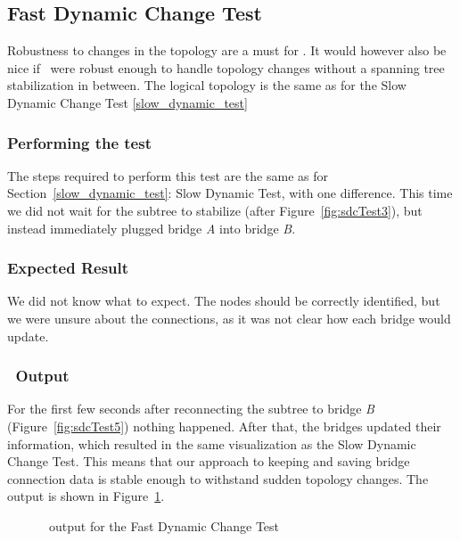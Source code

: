 \subsection*{Fast Dynamic Change Test}
\label{fast_dynamic_test}
Robustness to changes in the topology are a must for \tool.
It would however also be nice if \tool\ were robust enough to handle topology changes without a spanning tree stabilization in between.
The logical topology is the same as for the Slow Dynamic Change Test \ref{slow_dynamic_test}

\subsubsection*{Performing the test}
The steps required to perform this test are the same as for Section~\ref{slow_dynamic_test}: Slow Dynamic Test, with one difference.
This time we did not wait for the subtree to stabilize (after Figure~\ref{fig:sdcTest3}), but instead immediately plugged bridge \textit{A} into bridge \textit{B}.

\subsubsection*{Expected Result}
We did not know what to expect.
The nodes should be correctly identified, but we were unsure about the connections, as it was not clear how each bridge would update.

\subsubsection*{\tool\ Output}
For the first few seconds after reconnecting the subtree to bridge \textit{B} (Figure~\ref{fig:sdcTest5}) nothing happened.
After that, the bridges updated their information, which resulted in the same visualization as the Slow Dynamic Change Test.
This means that our approach to keeping and saving bridge connection data is stable enough to withstand sudden topology changes.
The output is shown in Figure~\ref{fig:fdc}.
\begin{figure}[h]
    \centering
    
    \caption{\tool\ output for the Fast Dynamic Change Test}
    \label{fig:fdc}
\end{figure}
